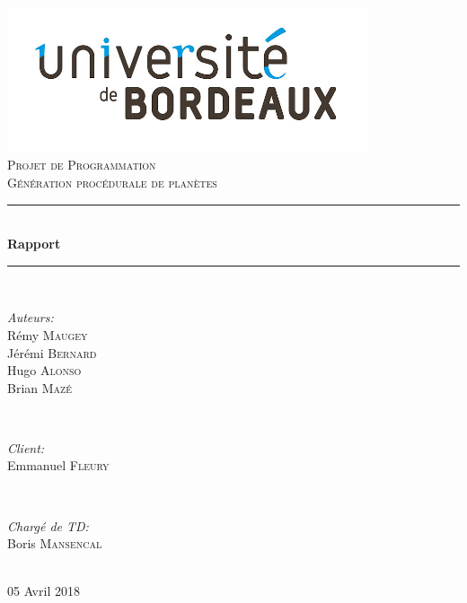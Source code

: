 \documentclass[12pt]{report}
\begin{document}

\begin{titlepage}

\newcommand{\HRule}{\rule{\linewidth}{0.7mm}} %

\center
 
\includegraphics[width=0.8\textwidth]{img/logo.jpg}\\

\textsc{\Large Projet de Programmation}\\[0.5cm]
\textsc{\large Génération procédurale de planètes}\\[0.5cm]


\HRule \\[0.4cm]
{ \huge \bfseries Rapport}\\[0.4cm]
\HRule \\[1.5cm]
 

\begin{minipage}{0.4\textwidth}
\begin{flushleft} \large
\emph{Auteurs:}\\
Rémy \textsc{Maugey}\\
Jérémi \textsc{Bernard}\\
Hugo \textsc{Alonso}\\
Brian \textsc{Mazé}\\
\end{flushleft}
\end{minipage}
~
\begin{minipage}{0.4\textwidth}
\begin{flushright} \large
\emph{Client:} \\
Emmanuel \textsc{Fleury}
\end{flushright}
~
\begin{flushright} \large
\emph{Chargé de TD:} \\
Boris \textsc{Mansencal}
\end{flushright}
\end{minipage}\\[2cm]


{\large 05 Avril 2018\\[2cm] }


\vfill %

\end{titlepage}
\end{document}
